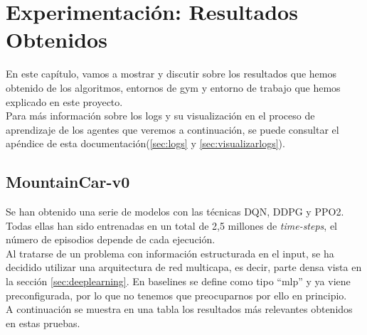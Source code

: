 \documentclass[11pt,fleqn]{book} %
\begin{document}
\chapter{Experimentación: Resultados Obtenidos}

En este capítulo, vamos a mostrar y discutir sobre los resultados que hemos obtenido de los algoritmos, entornos de gym y entorno de trabajo que hemos explicado en este proyecto. \\

Para más información sobre los logs y su visualización en el proceso de aprendizaje de los agentes que veremos a continuación, se puede consultar el apéndice de esta documentación(\ref{sec:logs} y \ref{sec:visualizarlogs}).

\section{MountainCar-v0}

Se han obtenido una serie de modelos con las técnicas DQN, DDPG y PPO2. Todas ellas han sido entrenadas en un total de 2,5 millones de \textit{time-steps}, el número de episodios depende de cada ejecución. \\

Al tratarse de un problema con información estructurada en el input, se ha decidido utilizar una arquitectura de red multicapa, es decir, parte densa vista en la sección \ref{sec:deeplearning}. En baselines se define como tipo ``mlp'' y ya viene preconfigurada, por lo que no tenemos que preocuparnos por ello en principio. \\

A continuación se muestra en una tabla los resultados más relevantes obtenidos en estas pruebas.
\end{document}
